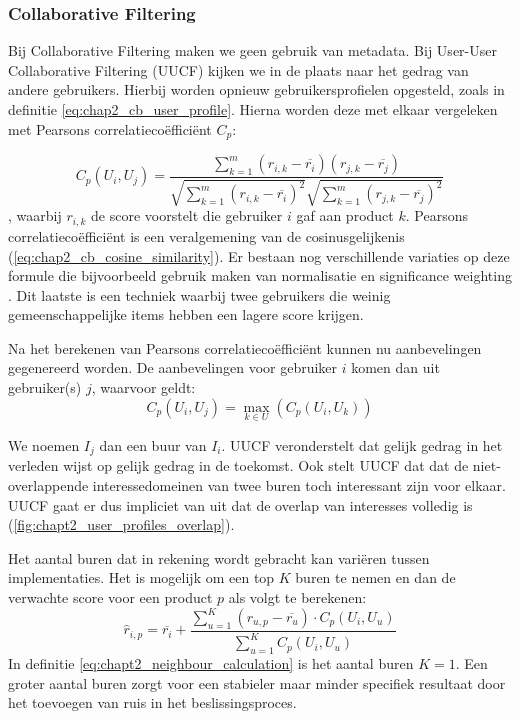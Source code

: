 \subsubsection{Collaborative Filtering}
\label{sec:chapt2_cf}
Bij Collaborative Filtering maken we geen gebruik van metadata. Bij User-User Collaborative Filtering (UUCF) kijken we in de plaats naar het gedrag van andere gebruikers. Hierbij worden opnieuw gebruikersprofielen opgesteld, zoals in definitie \ref{eq:chap2_cb_user_profile}. Hierna worden deze met elkaar vergeleken met Pearsons correlatiecoëfficiënt $C_p$:

\begin{equation}
    C_p(U_i, U_j) = \frac{\sum_{k = 1}^{m}(r_{i, k} - \overline{r_i})(r_{j, k} - \overline{r_j})}{\sqrt{\sum_{k = 1}^{m}(r_{i, k} - \overline{r_i})^2} \sqrt{\sum_{k = 1}^{m}(r_{j, k} - \overline{r_j})^2}}
    \label{eq:chapt2_pearson_corr}
\end{equation}
\cite{UUCF_original_paper}, waarbij $r_{i, k}$ de score voorstelt die gebruiker $i$ gaf aan product $k$.
Pearsons correlatiecoëfficiënt is een veralgemening van de cosinusgelijkenis (\ref{eq:chap2_cb_cosine_similarity}). Er bestaan nog verschillende variaties \cite{UUCF_alternative_implementations} op deze formule die bijvoorbeeld gebruik maken van normalisatie en significance weighting \cite{CF_significance_weighting}. Dit laatste is een techniek waarbij twee gebruikers die weinig gemeenschappelijke items hebben een lagere score krijgen.

Na het berekenen van Pearsons correlatiecoëfficiënt kunnen nu aanbevelingen gegenereerd worden. De aanbevelingen voor gebruiker $i$ komen dan uit gebruiker(s) $j$, waarvoor geldt:
\begin{equation}
    C_p(U_i, U_j) = \max_{k \in U}(C_p(U_i, U_k))    
    \label{eq:chapt2_neighbour_calculation}
\end{equation}

We noemen $I_j$ dan een buur van $I_i$. UUCF veronderstelt dat gelijk gedrag in het verleden wijst op gelijk gedrag in de toekomst. Ook stelt UUCF dat dat de niet-overlappende interessedomeinen van twee buren toch interessant zijn voor elkaar. UUCF gaat er dus impliciet van uit dat de overlap van interesses volledig is (\autoref{fig:chapt2_user_profiles_overlap}).


Het aantal buren dat in rekening wordt gebracht kan variëren tussen implementaties. Het is mogelijk om een top $K$ buren te nemen en dan de verwachte score voor een product $p$ als volgt te berekenen:
\begin{equation}
    \hat{r}_{i, p} = \overline{r_i} + \frac{\sum_{u=1}^{K}(r_{u, p} - \overline{r_u}) \cdot C_p(U_i, U_u)}{\sum_{u=1}^{K} C_p(U_i, U_u)}
    \label{eq:chapt2_uucf_finding_predictions_from_neighbours}
\end{equation}
In definitie \ref{eq:chapt2_neighbour_calculation} is het aantal buren $K = 1$. Een groter aantal buren zorgt voor een stabieler maar minder specifiek resultaat door het toevoegen van ruis in het beslissingsproces. \cite{cursus_hs8}

